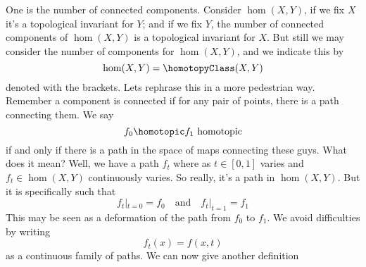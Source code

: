 One is the number of connected components. Consider $\hom(X,Y)$,
if we fix $X$ it's a topological invariant for $Y$; and if we fix
$Y$, the number of connected components of $\hom(X,Y)$ is a
topological invariant for $X$. 
But still we may consider the number of components for
$\hom(X,Y)$, and we indicate this by
\begin{equation}
\hom(X,Y)=\homotopyClass(X,Y)
\end{equation}
denoted with the brackets. Lets rephrase this in a more
pedestrian way. Remember a component is connected if for any pair
of points, there is a path connecting them. We
say
\begin{equation}
f_{0}\homotopic f_{1}\mbox{ homotopic}
\end{equation}
if and only if there is a path in the space of maps connecting
these guys. What does it mean? Well, we have a path $f_{t}$ where
as $t\in[0,1]$ varies and $f_{t}\in\hom(X,Y)$ continuously
varies. So really, it's a path in $\hom(X,Y)$. But it is
specifically such that
\begin{equation}
f_{t}|_{t=0}=f_{0}\quad\mbox{and}\quad
f_{t}|_{t=1}=f_{1}
\end{equation}
This may be seen as a deformation of the path from $f_0$ to
$f_1$. We avoid difficulties by writing
\begin{equation}
f_{t}(x)=f(x,t)
\end{equation}
as a continuous family of paths. We can now give another
definition
\be


